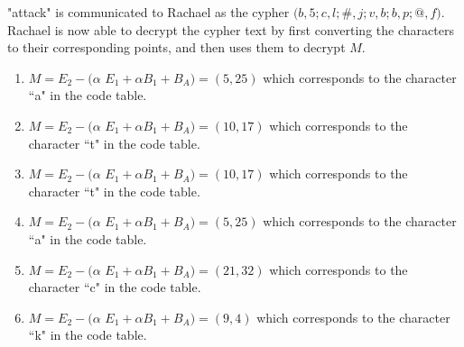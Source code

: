 \begin{eg}
\begin{flushleft}
"attack" is communicated to Rachael as the cypher $(b,5; c,l; $$\#$$,j; v,b; b,p; @,f)$. Rachael is now able to decrypt the cypher text by first converting the characters to their corresponding points, and then uses them to decrypt $M$.
\end{flushleft}
\begin{enumerate}[(1)]
\item $M = E_2 - ($$\alpha$ $E_1 +$$\alpha$$B_1 +B_A) = (5, 25)$ which corresponds to the character ``a" in the code table.\newline
\item $M = E_2 - ($$\alpha$ $E_1 +$$\alpha$$B_1 +B_A) = (10, 17)$ which corresponds to the character ``t" in the code table.\newline
\item $M = E_2 - ($$\alpha$ $E_1 +$$\alpha$$B_1 +B_A) = (10, 17)$ which corresponds to the character ``t" in the code table.\newline
\item $M = E_2 - ($$\alpha$ $E_1 +$$\alpha$$B_1 +B_A) = (5, 25)$ which corresponds to the character ``a" in the code table.\newline
\item $M = E_2 - ($$\alpha$ $E_1 +$$\alpha$$B_1 +B_A) = (21, 32)$ which corresponds to the character ``c" in the code table.\newline
\item $M = E_2 - ($$\alpha$ $E_1 +$$\alpha$$B_1 +B_A) = (9, 4)$ which corresponds to the character ``k" in the code table.\newline
\end{enumerate}
\end{eg} 
